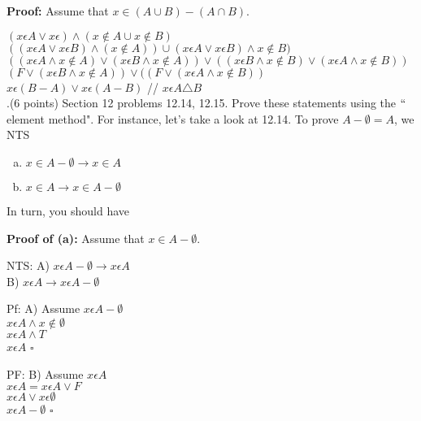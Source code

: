 \documentclass[12pt]{article}
\begin{document}
\noindent \textbf{Proof:}  Assume that $x \in (A \cup B) - (A \cap B)$.  
\vspace{.15in}

\Rightarrow  $(x \epsilon A \vee x \epsilon) \wedge (x \notin A \cup x \notin B)$ \\ 
\Rightarrow $ ((x \epsilon A \vee x \epsilon B) \wedge (x \notin A)) \cup (x\epsilon A \vee x \epsilon B) \wedge x \notin B)$ \\ 
\Rightarrow $(( x \epsilon A \wedge x \notin A) \vee ( x\epsilon B \wedge x \notin A)) \vee ((x \epsilon B \wedge x \notin  B) \vee (x \epsilon A \wedge x \notin B))$ \\ 
\Rightarrow $ (F \vee ( x \epsilon B \wedge x \notin A)) \vee (( F \vee (x \epsilon A \wedge x \notin B))$ \\ 
\Rightarrow $x\epsilon (B-A) \vee x \epsilon (A-B)$ // 
\Rightarrow $x \epsilon A \triangle B$ \;\; \square \\



.(6 points)  Section 12 problems 12.14, 12.15.  Prove these statements using the $``$element method".  For instance, let's take a look at 12.14.  To prove $A - \emptyset = A$, we NTS
\begin{enumerate}[(a).]
    \item \textit{$x \in A - \emptyset \longrightarrow x \in A$}
    \item \textit{$x \in A \longrightarrow x \in A - \emptyset$}
\end{enumerate}
In turn, you should have 
\vspace{.15in}

\noindent \textbf{Proof of (a):}  Assume that $x \in A - \emptyset$.  
\vspace{.15in}
\item NTS: A) $x \epsilon A - \emptyset \rightarrow x \epsilon A$ \\ 
\indent B) $x \epsilon A \rightarrow x \epsilon A - \emptyset$
\item Pf: A) Assume $x \epsilon A - \emptyset$ \\
\Rightarrow $x\epsilon A \wedge x \notin \emptyset$ \\
\Rightarrow $x \epsilon A \wedge T$ \\ 
\Rightarrow $x \epsilon A$ \;\; $\square$
\\ 
\item PF: B) Assume $x \epsilon A$ \\ 
\Rightarrow $x \epsilon A = x \epsilon A \vee F$ \\ \Rightarrow $x \epsilon A \vee x \epsilon \emptyset $ \\ 
\Rightarrow $x \epsilon A - \emptyset$ \;\; $\square$ \\
\end{document}
